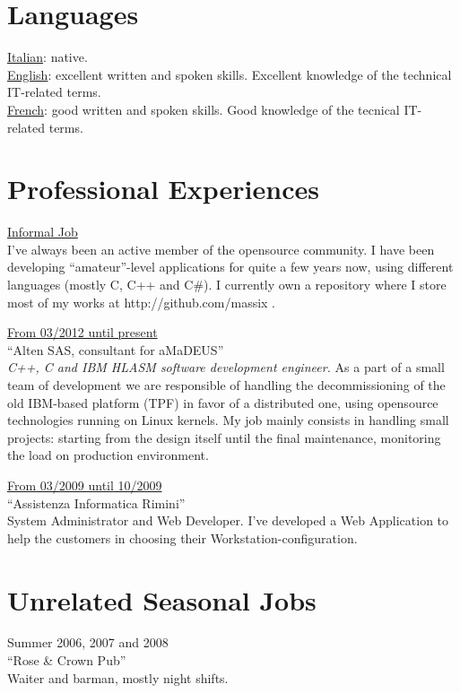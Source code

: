 \documentclass[margin]{res}
\begin{document}
\begin{resume}
\section{Languages} 
\underline{Italian}: native. \\
\underline{English}: excellent written and spoken skills. Excellent knowledge of the technical 
IT-related terms. \\
\underline{French}: good written and spoken skills. Good knowledge of the tecnical
IT-related terms.
 

\section{Professional Experiences}
\underline{Informal Job} \\
I've always been an active member of the opensource community. I have been developing ``amateur''-level
applications for quite a few years now, using different languages (mostly C, C++ and C\#). I currently
own a repository where I store most of my works at http://github.com/massix .

\vspace{2mm}

\underline{From 03/2012 until present} \\
``Alten SAS, consultant for aMaDEUS'' \\
\emph{C++, C and IBM HLASM software development engineer.}
As a part of a small team of development we are responsible of handling the decommissioning of the
old IBM-based platform (TPF) in favor of a distributed one, using opensource technologies running
on Linux kernels. My job mainly consists in handling small projects: starting from the design itself
until the final maintenance, monitoring the load on production environment.

\vspace{2mm}


\underline{From 03/2009 until 10/2009} \\
``Assistenza Informatica Rimini'' \\
System Administrator and Web Developer. I've developed a Web Application to help the customers
in choosing their Workstation-configuration.

\section{Unrelated Seasonal Jobs}
Summer 2006, 2007 and 2008 \\
``Rose \& Crown Pub'' \\
Waiter and barman, mostly night shifts.


\end{resume}
\end{document}
